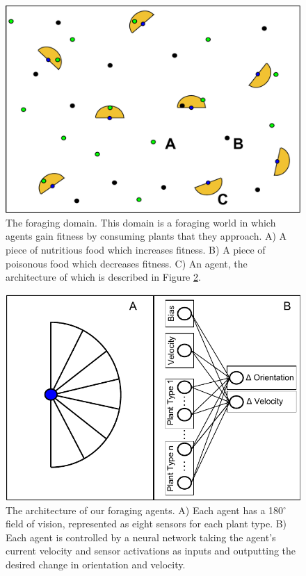 \documentclass{sig-alternate}
\begin{document}
\begin{figure}[t]
  \centering
    \includegraphics[scale=.333]{world.pdf}
  \caption{The foraging domain. This domain is a foraging world in which agents gain fitness by consuming plants that they approach.  A) A piece of nutritious food which increases fitness. B) A piece of poisonous food which decreases fitness. C) An agent, the architecture of which is described in Figure \ref{fig:agent-architecture}.}
  \label{fig:foraging-world}
\end{figure}
\begin{figure}[t]
  \centering
    \includegraphics[scale=.665]{foraging_agent_architecture.pdf}  \caption{The architecture of our foraging agents. A) Each agent has a 180$^{\circ}$ field of vision, represented as eight sensors for each plant type. B) Each agent is controlled by a neural network taking the agent's current velocity and sensor activations as inputs and outputting the desired change in orientation and velocity.}
  \label{fig:agent-architecture}
\end{figure}
\end{document}
